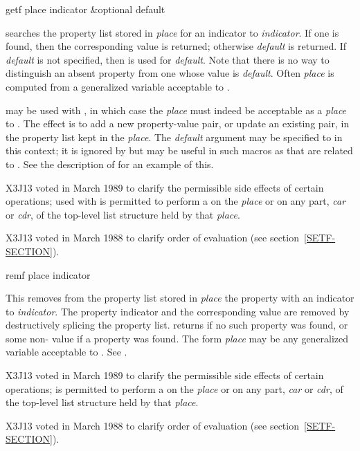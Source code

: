 \begin{defun}[Function]
getf place indicator &optional default

 searches the property list stored in \emph{place}
for an indicator  to \emph{indicator}.
If one is found, then the corresponding value is returned;
otherwise \emph{default} is returned.  If \emph{default} is not specified,
then {\false} is used for \emph{default}.
Note that there is no way to distinguish an absent property from
one whose value is \emph{default}.
Often \emph{place} is computed from
a generalized variable acceptable to .

 may be used with , in which case the \emph{place} must
indeed be acceptable as a \emph{place} to .  The effect is to
add a new property-value pair, or update an existing pair,
in the property list kept in the \emph{place}.
The \emph{default} argument may be
specified to  in this context; it is ignored by  but
may be useful in such macros as  that are related to .
See the description of  for an example of this.

\begin{newer}
X3J13 voted in March 1989 
to clarify the permissible side effects of certain operations;
 used with  is permitted to perform a 
on the \emph{place} or on any part, \emph{car} or \emph{cdr}, of the
top-level list structure held by that \emph{place}.
\end{newer}

\begin{newer}
X3J13 voted in March 1988 
to clarify order of evaluation (see section~\ref{SETF-SECTION}).
\end{newer}
\end{defun}

\begin{defmac}
remf place indicator

This removes from the property list stored in \emph{place}
the property with an indicator 
to \emph{indicator}.  The property indicator and the corresponding
value are removed by destructively splicing the property
list.   returns {\false} if no such property was found,
or some non-{\nil} value if a property was found.
The form \emph{place} may be any generalized variable acceptable to .
See .

\begin{newer}
X3J13 voted in March 1989 
to clarify the permissible side effects of certain operations;
 is permitted to perform a 
on the \emph{place} or on any part, \emph{car} or \emph{cdr}, of the
top-level list structure held by that \emph{place}.
\end{newer}

\begin{newer}
X3J13 voted in March 1988 
to clarify order of evaluation (see section~\ref{SETF-SECTION}).
\end{newer}
\end{defmac}

